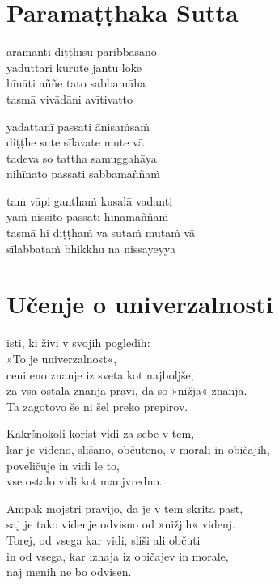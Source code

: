 

\cleartoverso
\chapter*{Paramaṭṭhaka Sutta}

aramanti diṭṭhīsu paribbasāno\\
yaduttari kurute jantu loke\\
hīnāti aññe tato sabbamāha\\
tasmā vivādāni avītivatto

yadattanī passati ānisaṁsaṁ\\
diṭṭhe sute sīlavate mute vā\\
tadeva so tattha samuggahāya\\
nihīnato passati sabbamaññaṁ

taṁ vāpi ganthaṁ kusalā vadanti\\
yaṁ nissito passati hīnamaññaṁ\\
tasmā hi diṭṭhaṁ va sutaṁ mutaṁ vā\\
sīlabbataṁ bhikkhu na nissayeyya


\cleartorecto
\chapter{Učenje o univerzalnosti}

isti, ki živi v svojih pogledih:\\
»To je univerzalnost«,\\
ceni eno znanje iz sveta kot najboljše;\\
za vsa ostala znanja pravi, da so »nižja« znanja.\\
Ta zagotovo še ni šel preko prepirov.

Kakršnokoli korist vidi za sebe v tem,\\
kar je videno, slišano, občuteno, v morali in običajih,\\
poveličuje in vidi le to,\\
vse ostalo vidi kot manjvredno.

Ampak mojstri pravijo, da je v tem skrita past,\\
saj je tako videnje odvisno od »nižjih« videnj.\\
Torej, od vsega kar vidi, sliši ali občuti\\
in od vsega, kar izhaja iz običajev in morale,\\\vin naj menih ne bo odvisen.

